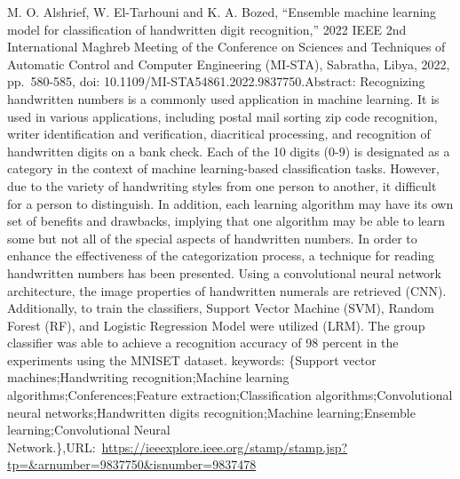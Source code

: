 \documentclass[
]{report}
\begin{document}
M. O. Alshrief, W. El-Tarhouni and K. A. Bozed, ``Ensemble machine learning model for classification of handwritten digit recognition,'' 2022 IEEE 2nd International Maghreb Meeting of the Conference on Sciences and Techniques of Automatic Control and Computer Engineering (MI-STA), Sabratha, Libya, 2022, pp.~580-585, doi: 10.1109/MI-STA54861.2022.9837750.Abstract: Recognizing handwritten numbers is a commonly used application in machine learning. It is used in various applications, including postal mail sorting zip code recognition, writer identification and verification, diacritical processing, and recognition of handwritten digits on a bank check. Each of the 10 digits (0-9) is designated as a category in the context of machine learning-based classification tasks. However, due to the variety of handwriting styles from one person to another, it difficult for a person to distinguish. In addition, each learning algorithm may have its own set of benefits and drawbacks, implying that one algorithm may be able to learn some but not all of the special aspects of handwritten numbers. In order to enhance the effectiveness of the categorization process, a technique for reading handwritten numbers has been presented. Using a convolutional neural network architecture, the image properties of handwritten numerals are retrieved (CNN). Additionally, to train the classifiers, Support Vector Machine (SVM), Random Forest (RF), and Logistic Regression Model were utilized (LRM). The group classifier was able to achieve a recognition accuracy of 98 percent in the experiments using the MNISET dataset. keywords: \{Support vector machines;Handwriting recognition;Machine learning algorithms;Conferences;Feature extraction;Classification algorithms;Convolutional neural networks;Handwritten digits recognition;Machine learning;Ensemble learning;Convolutional Neural Network.\},URL:~\url{https://ieeexplore.ieee.org/stamp/stamp.jsp?tp=&arnumber=9837750&isnumber=9837478}

\printbibliography
\end{document}
